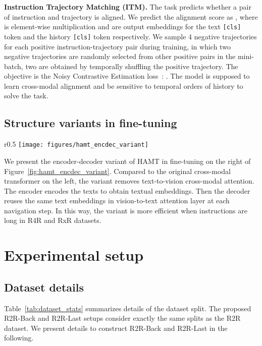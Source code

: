 \noindent\textbf{Instruction Trajectory Matching (ITM).}
The task predicts whether a pair of instruction and trajectory is aligned.
We predict the alignment score as , where  is element-wise multiplication and  are output embeddings for the text \verb|[cls]| token and the history \verb|[cls]| token respectively.
We sample 4 negative trajectories for each positive instruction-trajectory pair during training, in which two negative trajectories are randomly selected from other positive pairs in the mini-batch, two are obtained by temporally shuffling the positive trajectory.
The objective is the Noisy Contrastive Estimation loss~\cite{gutmann2010noise}: .
The model is supposed to learn cross-modal alignment and be sensitive to temporal orders of history to solve the task.


\subsection{Structure variants in fine-tuning}
\label{sec:supp_hamt_nov2t}
\begin{wrapfigure}{r}{0.5\textwidth}
	\centering
	\vspace{-4em}
	\texttt{[image: figures/hamt\_encdec\_variant]}
	\caption{Comparison of the original cross-modal transformer layer (left) and the encoder-decoder based variant (right).}
	\label{fig:hamt_encdec_variant}
	\vspace{-4em}
\end{wrapfigure}


We present the encoder-decoder variant of HAMT in fine-tuning on the right of Figure~\ref{fig:hamt_encdec_variant}.
Compared to the original cross-modal transformer on the left, the variant removes text-to-vision cross-modal attention. 
The encoder encodes the texts to obtain textual embeddings. Then the decoder reuses the same text embeddings in vision-to-text attention layer at each navigation step.
In this way, the variant is more efficient when instructions are long \eg in R4R and RxR datasets.


\section{Experimental setup}
\label{sec:expr_details}
\subsection{Dataset details}
Table~\ref{tab:dataset_stats} summarizes details of the dataset split.
The proposed R2R-Back and R2R-Last setups consider exactly the same splits as the R2R dataset.
We present details to construct R2R-Back and R2R-Last in the following.

